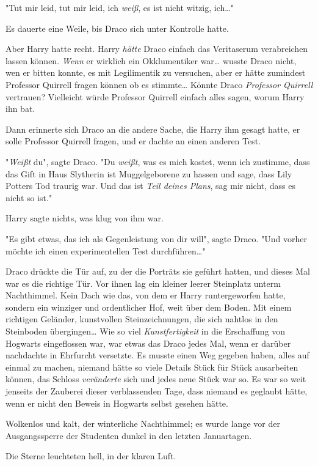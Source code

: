 {"Tut mir leid, tut mir leid, ich \emph{weiß}, es ist nicht witzig, ich…"

Es dauerte eine Weile, bis Draco sich unter Kontrolle hatte.

Aber Harry hatte recht. Harry \emph{hätte} Draco einfach das Veritaserum verabreichen lassen können. \emph{Wenn} er wirklich ein Okklumentiker war… wusste Draco nicht, wen er bitten konnte, es mit Legilimentik zu versuchen, aber er hätte zumindest Professor Quirrell fragen können ob es stimmte… Könnte Draco \emph{Professor Quirrell} vertrauen? Vielleicht würde Professor Quirrell einfach alles sagen, worum Harry ihn bat.

Dann erinnerte sich Draco an die andere Sache, die Harry ihm gesagt hatte, er solle Professor Quirrell fragen, und er dachte an einen anderen Test.

"\emph{Weißt} du", sagte Draco. "Du \emph{weißt}, was es mich kostet, wenn ich zustimme, dass das Gift in Haus Slytherin ist Muggelgeborene zu hassen und sage, dass Lily Potters Tod traurig war. Und das ist \emph{Teil deines Plans}, sag mir nicht, dass es nicht so ist."

Harry sagte nichts, was klug von ihm war.

"Es gibt etwas, das ich als Gegenleistung von dir will", sagte Draco. "Und vorher möchte ich einen experimentellen Test durchführen…"

Draco drückte die Tür auf, zu der die Porträts sie geführt hatten, und dieses Mal war es die richtige Tür. Vor ihnen lag ein kleiner leerer Steinplatz unterm Nachthimmel. Kein Dach wie das, von dem er Harry runtergeworfen hatte, sondern ein winziger und ordentlicher Hof, weit über dem Boden. Mit einem richtigen Geländer, kunstvollen Steinzeichnungen, die sich nahtlos in den Steinboden übergingen… Wie so viel \emph{Kunstfertigkeit} in die Erschaffung von Hogwarts eingeflossen war, war etwas das Draco jedes Mal, wenn er darüber nachdachte in Ehrfurcht versetzte. Es musste einen Weg gegeben haben, alles auf einmal zu machen, niemand hätte so viele Details Stück für Stück ausarbeiten können, das Schloss \emph{veränderte} sich und jedes neue Stück war so. Es war so weit jenseits der Zauberei dieser verblassenden Tage, dass niemand es geglaubt hätte, wenn er nicht den Beweis in Hogwarts selbst gesehen hätte.

Wolkenlos und kalt, der winterliche Nachthimmel; es wurde lange vor der Ausgangssperre der Studenten dunkel in den letzten Januartagen.

Die Sterne leuchteten hell, in der klaren Luft.

}
